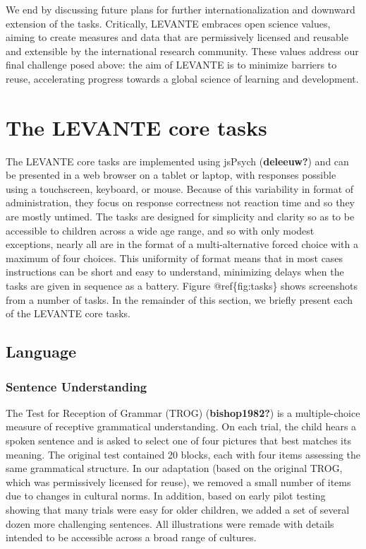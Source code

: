 \documentclass[
  english,
  man]{apa6}
\begin{document}
We end by discussing future plans for further internationalization and downward extension of the tasks. Critically, LEVANTE embraces open science values, aiming to create measures and data that are permissively licensed and reusable and extensible by the international research community. These values address our final challenge posed above: the aim of LEVANTE is to minimize barriers to reuse, accelerating progress towards a global science of learning and development.

\section{The LEVANTE core tasks}\label{the-levante-core-tasks}

The LEVANTE core tasks are implemented using jsPsych (\textbf{deleeuw?}) and can be presented in a web browser on a tablet or laptop, with responses possible using a touchscreen, keyboard, or mouse. Because of this variability in format of administration, they focus on response correctness not reaction time and so they are mostly untimed. The tasks are designed for simplicity and clarity so as to be accessible to children across a wide age range, and so with only modest exceptions, nearly all are in the format of a multi-alternative forced choice with a maximum of four choices. This uniformity of format means that in most cases instructions can be short and easy to understand, minimizing delays when the tasks are given in sequence as a battery. Figure @ref\{fig:tasks\} shows screenshots from a number of tasks. In the remainder of this section, we briefly present each of the LEVANTE core tasks.

\subsection{Language}\label{language}

\subsubsection{Sentence Understanding}\label{sentence-understanding}

The Test for Reception of Grammar (TROG) (\textbf{bishop1982?}) is a multiple-choice measure of receptive grammatical understanding. On each trial, the child hears a spoken sentence and is asked to select one of four pictures that best matches its meaning. The original test contained 20 blocks, each with four items assessing the same grammatical structure. In our adaptation (based on the original TROG, which was permissively licensed for reuse), we removed a small number of items due to changes in cultural norms. In addition, based on early pilot testing showing that many trials were easy for older children, we added a set of several dozen more challenging sentences. All illustrations were remade with details intended to be accessible across a broad range of cultures.
\end{document}
